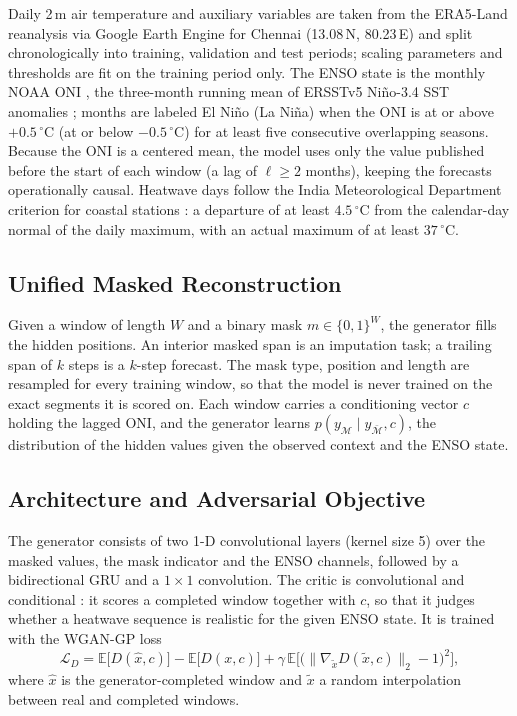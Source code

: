 \documentclass[conference]{IEEEtran}
\begin{document}
Daily 2\,m air temperature and auxiliary variables are taken from the ERA5-Land reanalysis
\cite{munozsabater2021era5land} via Google Earth Engine \cite{gorelick2017gee} for Chennai
(13.08\,\textdegree N, 80.23\,\textdegree E) and split chronologically into training, validation and
test periods; scaling parameters and thresholds are fit on the training period only. The ENSO state is
the monthly NOAA ONI \cite{noaa_oni}, the three-month running mean of ERSSTv5 Ni\~{n}o-3.4 SST anomalies
\cite{huang2017ersstv5}; months are labeled El Ni\~{n}o (La Ni\~{n}a) when the ONI is at or above
$+0.5\,^{\circ}$C (at or below $-0.5\,^{\circ}$C) for at least five consecutive overlapping seasons.
Because the ONI is a centered mean, the model uses only the value published before the start of each
window (a lag of $\ell \geq 2$ months), keeping the forecasts operationally causal. Heatwave days follow
the India Meteorological Department criterion for coastal stations \cite{imd2024heatwave}: a departure
of at least $4.5\,^{\circ}$C from the calendar-day normal of the daily maximum, with an actual maximum of
at least $37\,^{\circ}$C.

\subsection{Unified Masked Reconstruction}

Given a window of length $W$ and a binary mask $m \in \{0,1\}^W$, the generator fills the hidden
positions. An interior masked span is an imputation task; a trailing span of $k$ steps is a $k$-step
forecast. The mask type, position and length are resampled for every training window, so that the
model is never trained on the exact segments it is scored on. Each window carries a conditioning
vector $c$ holding the lagged ONI, and the generator learns
$p(y_{\mathcal{M}} \mid y_{\bar{\mathcal{M}}}, c)$, the distribution of the hidden values given the
observed context and the ENSO state.

\subsection{Architecture and Adversarial Objective}

The generator consists of two 1-D convolutional layers (kernel size 5) over the masked values, the mask
indicator and the ENSO channels, followed by a bidirectional GRU and a $1\times1$ convolution. The
critic is convolutional and conditional \cite{mirza2014conditional}: it scores a completed window
together with $c$, so that it judges whether a heatwave sequence is realistic for the given ENSO state.
It is trained with the WGAN-GP loss \cite{gulrajani2017improved}
\begin{equation}
\mathcal{L}_D = \mathbb{E}\big[D(\hat{x}, c)\big] - \mathbb{E}\big[D(x, c)\big]
+ \gamma\, \mathbb{E}\Big[\big(\lVert \nabla_{\tilde{x}} D(\tilde{x}, c) \rVert_2 - 1\big)^2\Big],
\end{equation}
where $\hat{x}$ is the generator-completed window and $\tilde{x}$ a random interpolation between real
and completed windows.
\end{document}
